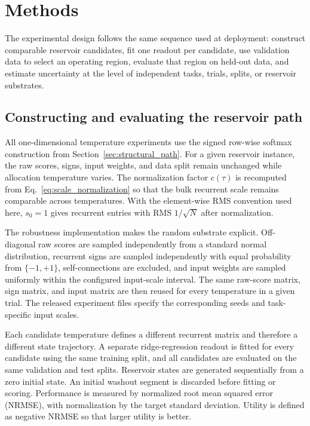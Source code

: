 \documentclass[preprint,12pt,authoryear]{elsarticle}
\begin{document}
\section{Methods}
\label{sec:methods}

The experimental design follows the same sequence used at deployment: construct comparable reservoir candidates, fit one readout per candidate, use validation data to select an operating region, evaluate that region on held-out data, and estimate uncertainty at the level of independent tasks, trials, splits, or reservoir substrates.

\subsection{Constructing and evaluating the reservoir path}
\label{sec:path_construction_methods}

All one-dimensional temperature experiments use the signed row-wise softmax construction from Section~\ref{sec:structural_path}. For a given reservoir instance, the raw scores, signs, input weights, and data split remain unchanged while allocation temperature varies. The normalization factor $c(\tau)$ is recomputed from Eq.~\eqref{eq:scale_normalization} so that the bulk recurrent scale remains comparable across temperatures. With the element-wise RMS convention used here, $s_0=1$ gives recurrent entries with RMS $1/\sqrt{N}$ after normalization.

The robustness implementation makes the random substrate explicit. Off-diagonal raw scores are sampled independently from a standard normal distribution, recurrent signs are sampled independently with equal probability from $\{-1,+1\}$, self-connections are excluded, and input weights are sampled uniformly within the configured input-scale interval. The same raw-score matrix, sign matrix, and input matrix are then reused for every temperature in a given trial. The released experiment files specify the corresponding seeds and task-specific input scales.

Each candidate temperature defines a different recurrent matrix and therefore a different state trajectory. A separate ridge-regression readout is fitted for every candidate using the same training split, and all candidates are evaluated on the same validation and test splits. Reservoir states are generated sequentially from a zero initial state. An initial washout segment is discarded before fitting or scoring. Performance is measured by normalized root mean squared error (NRMSE), with normalization by the target standard deviation. Utility is defined as negative NRMSE so that larger utility is better.
\end{document}
